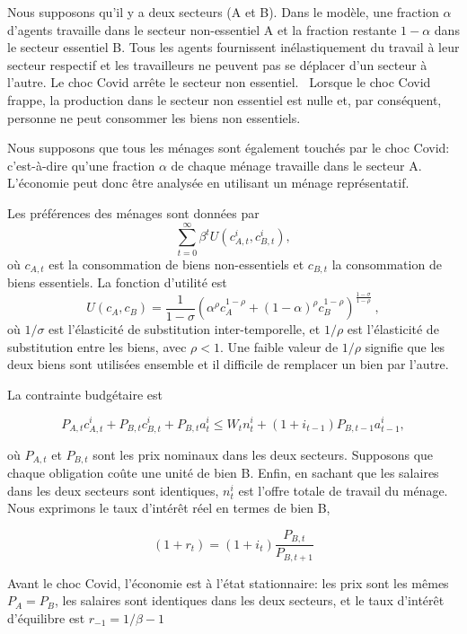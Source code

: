 \documentclass[11pt,a4paper]{article}
\begin{document}
Nous supposons qu'il y a deux secteurs (A et B). Dans le mod\`{e}le, une fraction $ \alpha $ d'agents travaille dans le secteur non-essentiel A et la fraction restante $ 1- \alpha $ dans le secteur essentiel B. Tous les agents fournissent in\'{e}lastiquement du travail \`{a} leur secteur respectif et les travailleurs ne peuvent pas se d\'{e}placer d'un secteur \`{a} l'autre. Le choc Covid arr\^{e}te le secteur non essentiel. \ Lorsque le choc Covid frappe, la production dans le secteur non essentiel est nulle et, par conséquent, personne ne peut consommer les biens non essentiels.


Nous supposons que tous les m\'{e}nages sont \'{e}galement touch\'{e}s par le choc Covid: c'est-\`{a}-dire qu'une fraction $ \alpha $ de chaque m\'{e}nage travaille dans le secteur A.  L'\'{e}conomie peut donc
\^{e}tre analys\'{e}e en utilisant un m\'{e}nage repr\'{e}sentatif. 


Les pr\'{e}f\'{e}rences des
m\'{e}nages  sont donn\'{e}es par%
\[
\sum_{t=0}^{\infty }\beta ^{t}U\left( c_{A,t}^{i},c_{B,t}^{i}\right) ,
\]%
o\`{u} $c_{A,t}$ est la consommation de biens non-essentiels et $c_{B,t}$ la
consommation de biens essentiels. La fonction d'utilit\'{e} est 
\[
U\left( c_{A},c_{B}\right) =\frac{1}{1-\sigma }\left( \alpha ^{\rho
}c_{A}^{1-\rho }+(1-\alpha )^{\rho }c_{B}^{1-\rho }\right) ^{\frac{1-\sigma 
}{1-\rho }}\ ,
\]
o\`{u} $1/\sigma $ est l'\'{e}lasticit\'{e} de substitution
inter-temporelle, et $1/\rho $ est l'\'{e}lasticit\'{e} de substitution entre
les biens, avec $\rho <1$. Une faible valeur de $1/\rho $  signifie que les deux biens sont utilis\'{e}es ensemble et il difficile de remplacer un bien par l'autre.

La contrainte budg\'{e}taire est

\[
P_{A,t}c_{A,t}^{i} + P_{B,t}c_{B,t}^{i} +P_{B,t}a_{t}^{i}\leq W_t n_{t}^{i}+(1+i_{t-1})P_{B,t-1}a_{t-1}^{i}, 
\]%

o\`{u} $ P_{A, t} $ et $ P_{B, t} $ sont les prix nominaux dans les deux secteurs. Supposons que chaque obligation co\^{u}te une unit\'{e} de bien B. Enfin, en sachant que les salaires dans les deux secteurs sont identiques,  $ n_{t}^{i} $ est l'offre totale de travail du m\'{e}nage. Nous exprimons le taux d'int\'{e}r\^{e}t r\'{e}el en termes de bien B,

\[
(1+r_t)= (1+i_t) \frac{P_{B,t}}{P_{B,t+1}} 
\]%


 Avant le choc Covid, l'\'{e}conomie est \`{a} l'\'{e}tat stationnaire: les prix sont les m\^{e}mes $ P_{A} = P_{B} $, les salaires sont identiques dans les deux secteurs, et le taux d'int\'{e}r\^{e}t d'\'{e}quilibre est $ r_{-1} = 1/\beta -1 $
 
\end{document}
